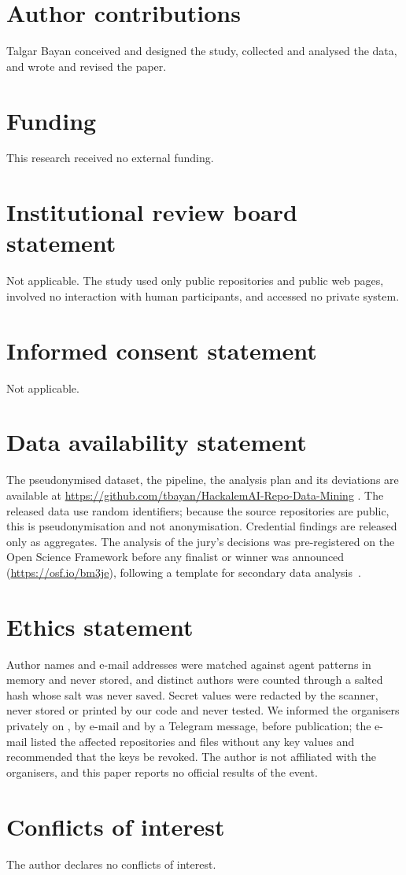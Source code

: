\documentclass{article}
\begin{document}
\section*{Author contributions}
Talgar Bayan conceived and designed the study, collected and analysed the data, and wrote and revised the paper.

\section*{Funding}
This research received no external funding.

\section*{Institutional review board statement}
Not applicable. The study used only public repositories and public web pages, involved no interaction with human participants, and accessed no private system.

\section*{Informed consent statement}
Not applicable.

\section*{Data availability statement}
The pseudonymised dataset, the pipeline, the analysis plan and its deviations are available at \url{https://github.com/tbayan/HackalemAI-Repo-Data-Mining} . The released data use random identifiers; because the source repositories are public, this is pseudonymisation and not anonymisation. Credential findings are released only as aggregates. The analysis of the jury's decisions was pre-registered on the Open Science Framework before any finalist or winner was announced (\url{https://osf.io/bm3je}), following a template for secondary data analysis~\cite{vandenakker2021prereg}.

\section*{Ethics statement}
Author names and e-mail addresses were matched against agent patterns in memory and never stored, and distinct authors were counted through a salted hash whose salt was never saved. Secret values were redacted by the scanner, never stored or printed by our code and never tested. We informed the organisers privately on \disclosuredate{}, by e-mail and by a Telegram message, before publication; the e-mail listed the affected repositories and files without any key values and recommended that the keys be revoked. The author is not affiliated with the organisers, and this paper reports no official results of the event.

\section*{Conflicts of interest}
The author declares no conflicts of interest.



\end{document}
